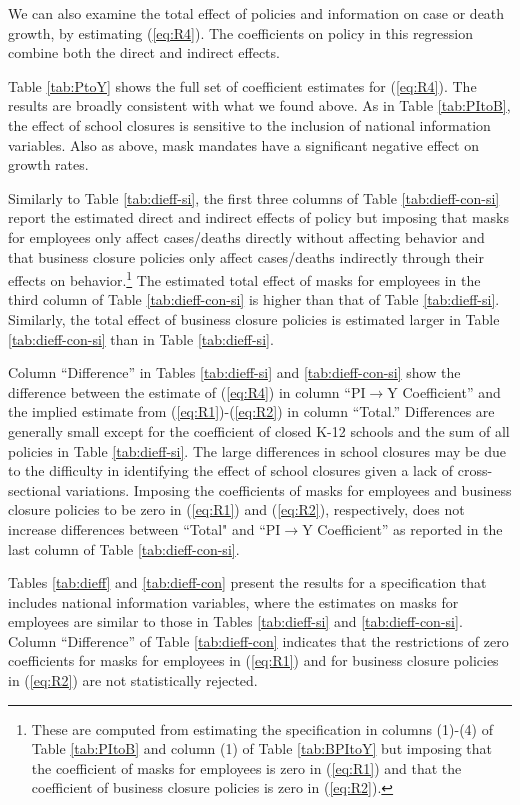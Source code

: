 \documentclass[11pt,reqno,letter]{amsart}
\theoremstyle{definition}
\renewcommand{\to}{{\rightarrow}}
\begin{document}
We can also examine the total effect of policies and information on
case  or death growth, by estimating (\ref{eq:R4}). The coefficients on policy
in this regression combine both the direct and indirect effects.

Table \ref{tab:PtoY} shows
the full set of coefficient estimates for
(\ref{eq:R4}). The results are broadly consistent with what we found
above.  As in Table \ref{tab:PItoB}, the effect of school closures is
sensitive to the inclusion of national information variables.  Also as
above, mask mandates have a significant negative effect on growth
rates.

Similarly to Table  \ref{tab:dieff-si}, the first three columns of  Table \ref{tab:dieff-con-si} report  the estimated direct and indirect effects of policy but imposing that masks for employees only affect cases/deaths directly without affecting behavior and that business closure policies only affect  cases/deaths indirectly through their effects on behavior.\footnote{These are computed from estimating the specification in columns (1)-(4) of
Table \ref{tab:PItoB} and column (1) of Table \ref{tab:BPItoY} but imposing that the coefficient of masks for employees is zero in (\ref{eq:R1}) and that the coefficient of business closure policies is zero in (\ref{eq:R2}).} The estimated total effect of masks for employees in the third column of Table \ref{tab:dieff-con-si} is higher than that of Table  \ref{tab:dieff-si}. Similarly, the total effect of business closure policies is estimated larger in Table \ref{tab:dieff-con-si} than in  Table  \ref{tab:dieff-si}.

Column ``Difference''  in Tables   \ref{tab:dieff-si} and \ref{tab:dieff-con-si}  show the
difference between the estimate of (\ref{eq:R4}) in column  ``PI$\to$Y Coefficient''   and the implied estimate from
(\ref{eq:R1})-(\ref{eq:R2}) in   column ``Total.''   Differences  are generally small except for the coefficient of closed K-12 schools and  the sum of all policies in Table   \ref{tab:dieff-si}. The large differences in school closures  may be due to the  difficulty in identifying the effect of school closures given a lack of cross-sectional variations. Imposing the coefficients of masks for employees and business closure policies to be zero in (\ref{eq:R1}) and  (\ref{eq:R2}), respectively, does not increase differences between  ``Total" and  ``PI$\to$Y Coefficient''  as reported in the last column of  Table \ref{tab:dieff-con-si}.

 Tables  \ref{tab:dieff} and \ref{tab:dieff-con}  present the results for a specification that includes national information variables, where the estimates on masks for employees are similar to those in  Tables  \ref{tab:dieff-si} and \ref{tab:dieff-con-si}. Column ``Difference''  of Table \ref{tab:dieff-con} indicates that the restrictions of zero coefficients for masks for employees in (\ref{eq:R1}) and for business closure policies in  (\ref{eq:R2}) are not statistically rejected.
\end{document}
